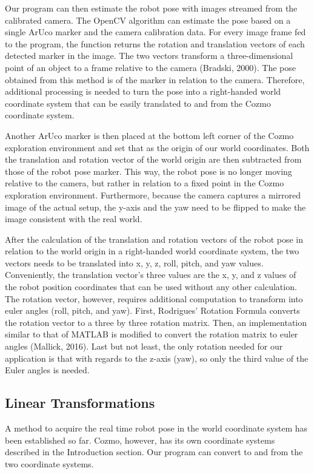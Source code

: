 \documentclass[jou,apacite]{apa6}
\begin{document}
Our program can then estimate the robot pose with images streamed from the calibrated camera. The OpenCV algorithm can estimate the pose based on a single ArUco marker and the camera calibration data. For every image frame fed to the program, the function returns the rotation and translation vectors of each detected marker in the image. The two vectors transform a three-dimensional point of an object to a frame relative to the camera (Bradski, 2000). The pose obtained from this method is of the marker in relation to the camera. Therefore, additional processing is needed to turn the pose into a right-handed world coordinate system that can be easily translated to and from the Cozmo coordinate system.

Another ArUco marker is then placed at the bottom left corner of the Cozmo exploration environment and set that as the origin of our world coordinates. Both the translation and rotation vector of the world origin are then subtracted from those of the robot pose marker. This way, the robot pose is no longer moving relative to the camera, but rather in relation to a fixed point in the Cozmo exploration environment. Furthermore, because the camera captures a mirrored image of the actual setup, the y-axis and the yaw need to be flipped to make the image consistent with the real world.

After the calculation of the translation and rotation vectors of the robot pose in relation to the world origin in a right-handed world coordinate system, the two vectors needs to be translated into x, y, z, roll, pitch, and yaw values. Conveniently, the translation vector’s three values are the x, y, and z values of the robot position coordinates that can be used without any other calculation. The rotation vector, however, requires additional computation to transform into euler angles (roll, pitch, and yaw). First, Rodrigues' Rotation Formula converts the rotation vector to a three by three rotation matrix. Then, an implementation similar to that of MATLAB is modified to convert the rotation matrix to euler angles (Mallick, 2016). Last but not least, the only rotation needed for our application is that with regards to the z-axis (yaw), so only the third value of the Euler angles is needed.


\subsection{Linear Transformations}
A method to acquire the real time robot pose in the world coordinate system has been established so far. Cozmo, however, has its own coordinate systems described in the Introduction section. Our program can convert to and from the two coordinate systems.
\end{document}
